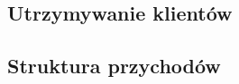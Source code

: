 \documentclass[12pt]{article}
\begin{document}


\subsection{Utrzymywanie klientów}



\subsection{Struktura przychodów}


\end{document}
